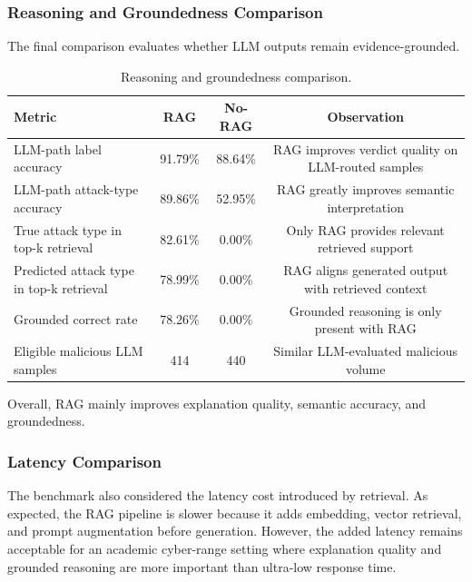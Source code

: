 \subsubsection{Reasoning and Groundedness Comparison}
The final comparison evaluates whether LLM outputs remain evidence-grounded.

\begin{table}[H]
    \centering
    \small
    \setlength{\tabcolsep}{5pt}
    \renewcommand{\arraystretch}{1.15}
    \begin{tabularx}{\textwidth}{|X|c|c|c|}
        \hline
        \textbf{Metric} & \textbf{RAG} & \textbf{No-RAG} & \textbf{Observation} \\
        \hline
        LLM-path label accuracy & 91.79\% & 88.64\% & RAG improves verdict quality on LLM-routed samples \\
        \hline
        LLM-path attack-type accuracy & 89.86\% & 52.95\% & RAG greatly improves semantic interpretation \\
        \hline
        True attack type in top-k retrieval & 82.61\% & 0.00\% & Only RAG provides relevant retrieved support \\
        \hline
        Predicted attack type in top-k retrieval & 78.99\% & 0.00\% & RAG aligns generated output with retrieved context \\
        \hline
        Grounded correct rate & 78.26\% & 0.00\% & Grounded reasoning is only present with RAG \\
        \hline
        Eligible malicious LLM samples & 414 & 440 & Similar LLM-evaluated malicious volume \\
        \hline
    \end{tabularx}
    \caption{Reasoning and groundedness comparison.}
    \label{tab:groundedness-rag-vs-norag}
\end{table}

Overall, RAG mainly improves explanation quality, semantic accuracy, and groundedness.

\subsubsection{Latency Comparison}
The benchmark also considered the latency cost introduced by retrieval. As expected, the RAG pipeline is slower because it adds embedding, vector retrieval, and prompt augmentation before generation. However, the added latency remains acceptable for an academic cyber-range setting where explanation quality and grounded reasoning are more important than ultra-low response time.

